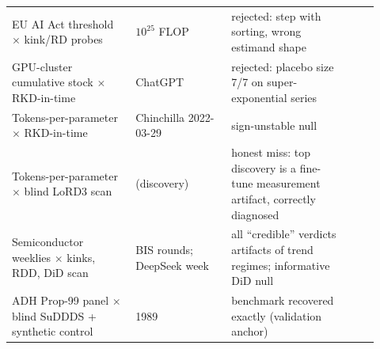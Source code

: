 \documentclass[11pt]{article}
\begin{document}
\begin{table}[p]
\begin{tabular}{@{}p{0.31\linewidth}p{0.24\linewidth}p{0.30\linewidth}p{0.075\linewidth}@{}}
EU AI Act threshold $\times$ kink/RD probes & $10^{25}$ FLOP &
rejected: step with sorting, wrong estimand shape & \cite{flagship} \\
GPU-cluster cumulative stock $\times$ RKD-in-time & ChatGPT &
rejected: placebo size 7/7 on super-exponential series & \cite{flagship} \\
Tokens-per-parameter $\times$ RKD-in-time & Chinchilla 2022-03-29 &
sign-unstable null & \cite{flagship} \\
Tokens-per-parameter $\times$ blind LoRD3 scan & (discovery) & honest miss:
top discovery is a fine-tune measurement artifact, correctly diagnosed &
\cite{notechinchilla} \\
Semiconductor weeklies $\times$ kinks, RDD, DiD scan & BIS rounds; DeepSeek
week & all ``credible'' verdicts artifacts of trend regimes; informative DiD
null & \cite{notesemis} \\
ADH Prop-99 panel $\times$ blind SuDDDS + synthetic control & 1989 &
benchmark recovered exactly (validation anchor) & \cite{noteprop99} \\
\bottomrule
\end{tabular}
\end{table}
\end{document}
